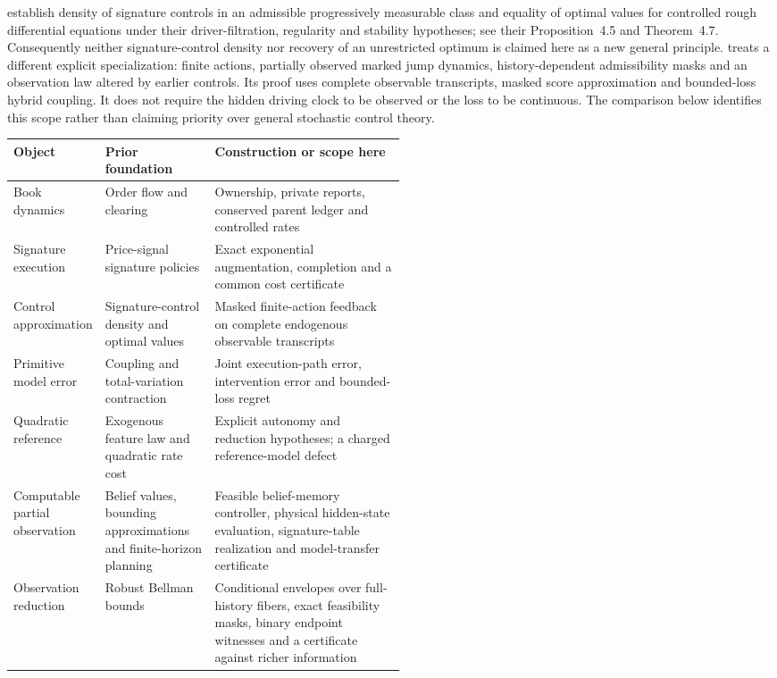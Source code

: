 \documentclass[11pt]{article}
\numberwithin{equation}{section}
\theoremstyle{definition}
\theoremstyle{remark}
\theoremstyle{definition}
\begin{document}
\citet{bank2025signatures} establish density of signature controls in an
admissible progressively measurable class and equality of optimal values
for controlled rough differential equations under their driver-filtration,
regularity and stability hypotheses; see their Proposition~4.5 and
Theorem~4.7. Consequently neither signature-control density nor recovery
of an unrestricted optimum is claimed here as a new general principle.
 treats a different explicit specialization: finite
actions, partially observed marked jump dynamics, history-dependent
admissibility masks and an observation law altered by earlier controls.
Its proof uses complete observable transcripts, masked score approximation
and bounded-loss hybrid coupling. It does not require the hidden driving
clock to be observed or the loss to be continuous. The comparison below
identifies this scope rather than claiming priority over general stochastic
control theory.

\begin{center}\small
\begin{tabularx}{\linewidth}{@{}p{0.22\linewidth}p{0.29\linewidth}Y@{}}
\toprule
Object & Prior foundation & Construction or scope here\\
\midrule
Book dynamics & Order flow and clearing \citep{contdegondxuan2025} &
 Ownership, private reports, conserved parent ledger and controlled rates\\
Signature execution & Price-signal signature policies \citep{kalsi2020} &
 Exact exponential augmentation, completion and a common cost certificate\\
Control approximation & Signature-control density and optimal values
 \citep{bank2025signatures} &
 Masked finite-action feedback on complete endogenous observable transcripts\\
Primitive model error & Coupling and total-variation contraction &
 Joint execution-path error, intervention error and bounded-loss regret\\
Quadratic reference & Exogenous feature law and quadratic rate cost &
 Explicit autonomy and reduction hypotheses; a charged reference-model defect\\
Computable partial observation & Belief values, bounding approximations and
 finite-horizon planning \citep{smallwood1973,lovejoy1991,walravenspaan2019} &
 Feasible belief-memory controller, physical hidden-state evaluation,
 signature-table realization and model-transfer certificate\\
Observation reduction & Robust Bellman bounds
 \citep{iyengar2005,nilim2005} &
 Conditional envelopes over full-history fibers, exact feasibility masks,
 binary endpoint witnesses and a certificate against richer information\\
\bottomrule
\end{tabularx}
\end{center}
\end{document}
